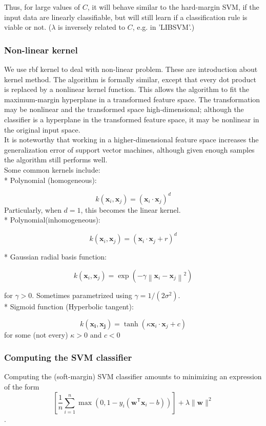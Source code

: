 Thus, for large values of $C$, it will behave similar to the hard-margin SVM, if the input data are linearly classifiable, but will still learn if a classification rule is viable or not. ($\lambda$ is inversely related to $C$, e.g. in 'LIBSVM'.)
\\

\subsubsection{\textbf{Non-linear kernel}}
We use rbf kernel to deal with non-linear problem. These are introduction about kernel method. The algorithm is formally similar, except that every dot product is replaced by a nonlinear kernel function. This allows the algorithm to fit the maximum-margin hyperplane in a transformed feature space. The transformation may be nonlinear and the transformed space high-dimensional; although the classifier is a hyperplane in the transformed feature space, it may be nonlinear in the original input space.
\\

It is noteworthy that working in a higher-dimensional feature space increases the generalization error of support vector machines, although given enough samples the algorithm still performs well.\\

Some common kernels include: \\
* Polynomial (homogeneous):

\[k(\mathbf{x}_i, \mathbf{x}_j) = (\mathbf{x}_i \cdot \mathbf{x}_j)^d\]
Particularly, when \(d=1\), this becomes the linear kernel. \\

* Polynomial(inhomogeneous):

\[k(\mathbf{x}_i, \mathbf{x}_j) = (\mathbf{x}_i \cdot \mathbf{x}_j + r)^d\]

* Gaussian radial basis function:

\[k(\mathbf{x}_i, \mathbf{x}_j) = \exp\left(-\gamma \left\|\mathbf{x}_i - \mathbf{x}_j\right\|^2\right)\]

for \(\gamma > 0\). Sometimes parametrized using \(\gamma = 1/(2\sigma^2)\). \\

* Sigmoid function (Hyperbolic tangent):

\[k(\mathbf{x_i}, \mathbf{x_j}) = \tanh(\kappa \mathbf{x}_i \cdot \mathbf{x}_j + c)\]
for some (not every) \(\kappa > 0\) and \(c < 0\)
\subsubsection{\textbf{Computing the SVM classifier}}
Computing the (soft-margin) SVM classifier amounts to minimizing an expression of the form
\[\left[\frac 1 n \sum_{i=1}^n \max\left(0, 1 - y_i(\mathbf{w}^\mathsf{T} \mathbf{x}_i - b)\right) \right] + \lambda \|\mathbf{w}\|^2\].
\\

